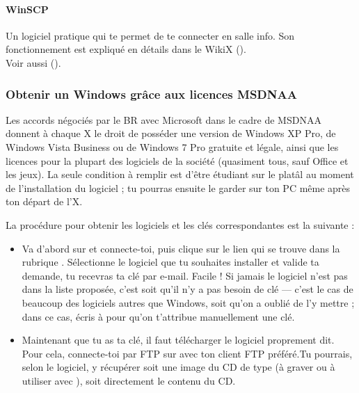   \paragraph{WinSCP} Un logiciel pratique qui te permet de te connecter en salle info.
                  Son fonctionnement est expliqu\'e en d\'etails dans le WikiX ().  \\
                  Voir aussi  ().


\subsubsection{Obtenir un Windows gr\^ace aux licences MSDNAA}

\label{msdnaa} Les accords n\'egoci\'es par le BR avec Microsoft dans le cadre de MSDNAA donnent \`a  chaque X le droit de poss\'eder une version de Windows
XP Pro, de Windows Vista Business ou de Windows 7 Pro gratuite et l\'egale, ainsi que les licences pour la plupart des logiciels de la soci\'et\'e (quasiment tous, sauf
Office et les jeux). La seule condition \`a  remplir est d'\^etre \'etudiant sur le plat\^al au moment de l'installation du logiciel ; tu pourras ensuite le
garder sur ton PC m\^eme apr\`es ton d\'epart de l'X.

La proc\'edure pour obtenir les logiciels et les cl\'es correspondantes
est la suivante :
\begin{itemize}

\item Va d'abord sur \fkz et connecte-toi, puis clique sur le lien  qui se trouve dans la rubrique . S\'electionne le logiciel que tu souhaites installer et valide ta demande, tu recevras ta cl\'e par e-mail. Facile ! Si jamais le logiciel n'est pas dans la liste propos\'ee, c'est soit qu'il n'y a pas besoin de cl\'e --- c'est le cas de beaucoup des logiciels autres que Windows, soit qu'on a oubli\'e de l'y mettre ; dans ce cas, \'ecris \`a   pour qu'on t'attribue manuellement une cl\'e.

\item Maintenant que tu as ta cl\'e, il faut t\'el\'echarger le logiciel proprement
dit. Pour cela, connecte-toi par FTP sur  avec ton client FTP pr\'ef\'er\'e.Tu pourrais, selon le logiciel, y r\'ecup\'erer soit une image du CD de type  (\`a 
graver ou \`a  utiliser avec ), soit directement le contenu du CD.
\end{itemize}

